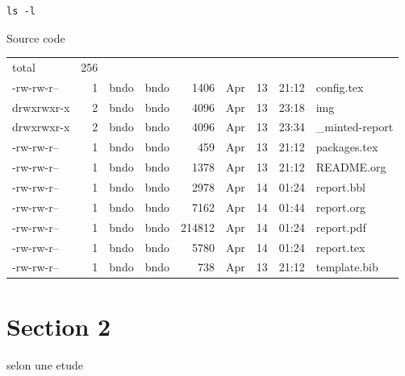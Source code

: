 \documentclass[12pt]{extarticle}
\let\cite\parencite
\begin{document}
\begin{listing}[htbp]
\begin{verbatim}
ls -l
\end{verbatim}
\caption{Source code}
\end{listing}

\begin{center}
\begin{tabular}{lrllrlrrl}
total & 256 &  &  &  &  &  &  & \\
-rw-rw-r-- & 1 & bndo & bndo & 1406 & Apr & 13 & 21:12 & config.tex\\
drwxrwxr-x & 2 & bndo & bndo & 4096 & Apr & 13 & 23:18 & img\\
drwxrwxr-x & 2 & bndo & bndo & 4096 & Apr & 13 & 23:34 & \_minted-report\\
-rw-rw-r-- & 1 & bndo & bndo & 459 & Apr & 13 & 21:12 & packages.tex\\
-rw-rw-r-- & 1 & bndo & bndo & 1378 & Apr & 13 & 21:12 & README.org\\
-rw-rw-r-- & 1 & bndo & bndo & 2978 & Apr & 14 & 01:24 & report.bbl\\
-rw-rw-r-- & 1 & bndo & bndo & 7162 & Apr & 14 & 01:44 & report.org\\
-rw-rw-r-- & 1 & bndo & bndo & 214812 & Apr & 14 & 01:24 & report.pdf\\
-rw-rw-r-- & 1 & bndo & bndo & 5780 & Apr & 14 & 01:24 & report.tex\\
-rw-rw-r-- & 1 & bndo & bndo & 738 & Apr & 13 & 21:12 & template.bib\\
\end{tabular}
\end{center}


\section{Section 2}
\label{sec:org2a13753}
\newpage


selon une etude \cite{2021}

\newpage

{}

\printbibliography
\end{document}
